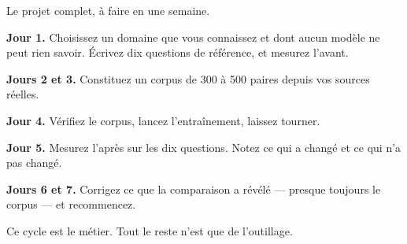 \begin{nkexo}
Le projet complet, à faire en une semaine.

\textbf{Jour 1.} Choisissez un domaine que vous connaissez et dont aucun modèle
ne peut rien savoir. Écrivez dix questions de référence, et mesurez l'avant.

\textbf{Jours 2 et 3.} Constituez un corpus de 300 à 500 paires depuis vos
sources réelles.

\textbf{Jour 4.} Vérifiez le corpus, lancez l'entraînement, laissez tourner.

\textbf{Jour 5.} Mesurez l'après sur les dix questions. Notez ce qui a changé et
ce qui n'a pas changé.

\textbf{Jours 6 et 7.} Corrigez ce que la comparaison a révélé — presque
toujours le corpus — et recommencez.

Ce cycle est le métier. Tout le reste n'est que de l'outillage.
\end{nkexo}
